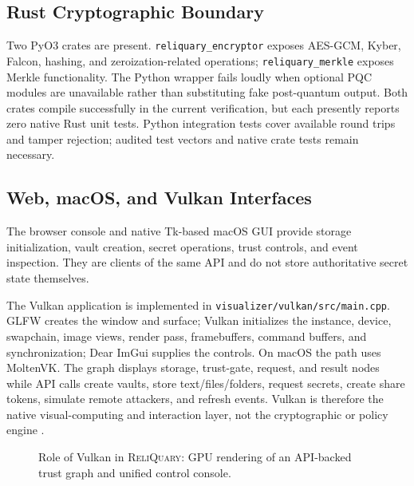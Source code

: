 \documentclass[10pt]{article}
\newcommand{\system}{\textsc{ReliQuary}}
\let\cite\citep
\begin{document}
\subsection*{Rust Cryptographic Boundary}

Two PyO3 crates are present. \texttt{reliquary\_encryptor} exposes AES-GCM, Kyber, Falcon, hashing, and zeroization-related operations; \texttt{reliquary\_merkle} exposes Merkle functionality. The Python wrapper fails loudly when optional PQC modules are unavailable rather than substituting fake post-quantum output. Both crates compile successfully in the current verification, but each presently reports zero native Rust unit tests. Python integration tests cover available round trips and tamper rejection; audited test vectors and native crate tests remain necessary.

\subsection*{Web, macOS, and Vulkan Interfaces}

The browser console and native Tk-based macOS GUI provide storage initialization, vault creation, secret operations, trust controls, and event inspection. They are clients of the same API and do not store authoritative secret state themselves.

The Vulkan application is implemented in \texttt{visualizer/vulkan/src/main.cpp}. GLFW creates the window and surface; Vulkan initializes the instance, device, swapchain, image views, render pass, framebuffers, command buffers, and synchronization; Dear ImGui supplies the controls. On macOS the path uses MoltenVK. The graph displays storage, trust-gate, request, and result nodes while API calls create vaults, store text/files/folders, request secrets, create share tokens, simulate remote attackers, and refresh events. Vulkan is therefore the native visual-computing and interaction layer, not the cryptographic or policy engine \cite{vulkan,imgui}.

\begin{figure}[ht]
\centering
{}
\caption{Role of Vulkan in \system: GPU rendering of an API-backed trust graph and unified control console.}
\label{fig:vulkan}
\end{figure}
\end{document}
